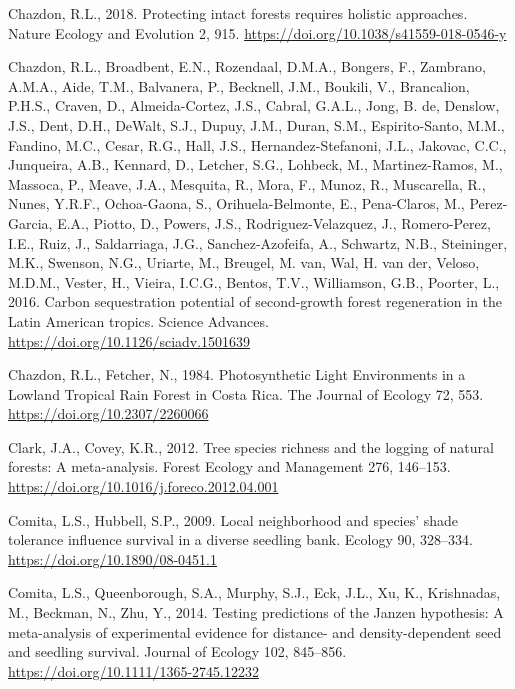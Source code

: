 \documentclass[
  12pt,
]{article}
\newlength{\cslhangindent}
\newlength{\cslentryspacingunit} %
\newenvironment{CSLReferences}[2] %
 {%
  \setlength{\parindent}{0pt}
  \ifodd #1
  \let\oldpar\par
  \def\par{\hangindent=\cslhangindent\oldpar}
  \fi
  \setlength{\parskip}{#2\cslentryspacingunit}
 }%
 {}
\begin{document}
\begin{CSLReferences}{1}{0}
\leavevmode{}%
Chazdon, R.L., 2018. Protecting intact forests requires holistic approaches. Nature Ecology and Evolution 2, 915. \url{https://doi.org/10.1038/s41559-018-0546-y}

\leavevmode{}%
Chazdon, R.L., Broadbent, E.N., Rozendaal, D.M.A., Bongers, F., Zambrano, A.M.A., Aide, T.M., Balvanera, P., Becknell, J.M., Boukili, V., Brancalion, P.H.S., Craven, D., Almeida-Cortez, J.S., Cabral, G.A.L., Jong, B. de, Denslow, J.S., Dent, D.H., DeWalt, S.J., Dupuy, J.M., Duran, S.M., Espirito-Santo, M.M., Fandino, M.C., Cesar, R.G., Hall, J.S., Hernandez-Stefanoni, J.L., Jakovac, C.C., Junqueira, A.B., Kennard, D., Letcher, S.G., Lohbeck, M., Martinez-Ramos, M., Massoca, P., Meave, J.A., Mesquita, R., Mora, F., Munoz, R., Muscarella, R., Nunes, Y.R.F., Ochoa-Gaona, S., Orihuela-Belmonte, E., Pena-Claros, M., Perez-Garcia, E.A., Piotto, D., Powers, J.S., Rodriguez-Velazquez, J., Romero-Perez, I.E., Ruiz, J., Saldarriaga, J.G., Sanchez-Azofeifa, A., Schwartz, N.B., Steininger, M.K., Swenson, N.G., Uriarte, M., Breugel, M. van, Wal, H. van der, Veloso, M.D.M., Vester, H., Vieira, I.C.G., Bentos, T.V., Williamson, G.B., Poorter, L., 2016. Carbon sequestration potential of second-growth forest regeneration in the {Latin American} tropics. Science Advances. \url{https://doi.org/10.1126/sciadv.1501639}

\leavevmode{}%
Chazdon, R.L., Fetcher, N., 1984. Photosynthetic {Light Environments} in a {Lowland Tropical Rain Forest} in {Costa Rica}. The Journal of Ecology 72, 553. \url{https://doi.org/10.2307/2260066}

\leavevmode{}%
Clark, J.A., Covey, K.R., 2012. Tree species richness and the logging of natural forests: {A} meta-analysis. Forest Ecology and Management 276, 146--153. \url{https://doi.org/10.1016/j.foreco.2012.04.001}

\leavevmode{}%
Comita, L.S., Hubbell, S.P., 2009. Local neighborhood and species' shade tolerance influence survival in a diverse seedling bank. Ecology 90, 328--334. \url{https://doi.org/10.1890/08-0451.1}

\leavevmode{}%
Comita, L.S., Queenborough, S.A., Murphy, S.J., Eck, J.L., Xu, K., Krishnadas, M., Beckman, N., Zhu, Y., 2014. Testing predictions of the {Janzen} hypothesis: A meta-analysis of experimental evidence for distance- and density-dependent seed and seedling survival. Journal of Ecology 102, 845--856. \url{https://doi.org/10.1111/1365-2745.12232}


\end{CSLReferences}
\end{document}
